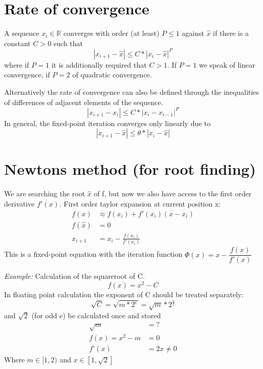 \section{Rate of convergence}\label{sec:rate-of-convergence}
A sequence $x_i \in \mathbb{R}$ converges with order (at least) $P \leq 1$ against $\hat{x}$ if there is a constant $C>0$ such that
\begin{equation*}
    |x_{i+1}-\hat{x}| \leq C * |x_i-\hat{x}|^P
\end{equation*}
where if $P=1$ it is additionally required that $C>1$.
If $P=1$ we speak of linear convergence, if $P=2$ of quadratic convergence.

Alternatively the rate of convergence can also be defined through the inequalities of differences of adjacent elements of the sequence.
\begin{equation*}
    |x_{i+1}-x_i| \leq C * |x_i-x_{i-1}|^P
\end{equation*}
In general, the fixed-point iteration converges only linearly due to
\begin{equation*}
    |x_{i+1}-\hat{x}| \leq \theta * |x_i-\hat{x}|
\end{equation*}


\section{Newtons method (for root finding)}\label{sec:newtons-method-(for-root-finding)}
We are searching the root $\hat{x}$ of f, but now we also have access to the first order derivative $f'(x)$.
First order taylor expansion at current position x:
\begin{align*}
    f(x) &\approx f(x_i)+ f'(x_i)(x-x_i)\\
    f(\hat{x}) &= 0\\
    x_{i+1} &= x_i - \frac{f(x_i)}{f'(x_i)}
\end{align*}
This is a fixed-point equation with the iteration function $\Phi(x)= x - \dfrac{f(x)}{f'(x)}$

\vspace{5mm}

\emph{Example:} Calculation of the squareroot of C\@.
\begin{equation*}
    f(x)=x^2-C
\end{equation*}
In floating point calculation the exponent of C should be treated separately:
\begin{equation*}
    \sqrt {C} = \sqrt {m * 2^e} = \sqrt {m} * 2^{\frac{e}{2}}
\end{equation*}
and $\sqrt{2}$ (for odd e) be calculated once and stored
\begin{align*}
    \sqrt {m} &= ? \\
    f(x) = x^2-m &= 0 \\
    f'(x) &= 2x \neq 0
\end{align*}
Where $m\in[1,2)$ and $x \in [1, \sqrt{2}]$

